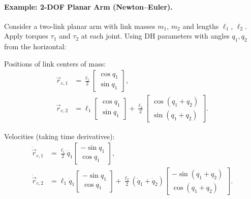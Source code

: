 \paragraph{Example: 2-DOF Planar Arm (Newton--Euler).}

Consider a two-link planar arm with link masses $m_1$, $m_2$ and lengths $\ell_1$, $\ell_2$.
Apply torques $\tau_1$ and $\tau_2$ at each joint. Using DH parameters with angles
$q_1, q_2$ from the horizontal:

Positions of link centers of mass:
\begin{align}
\vec{r}_{c,1} &= \frac{\ell_1}{2}\begin{bmatrix}\cos q_1 \\ \sin q_1\end{bmatrix}, \\
\vec{r}_{c,2} &= \ell_1\begin{bmatrix}\cos q_1 \\ \sin q_1\end{bmatrix}
+ \frac{\ell_2}{2}\begin{bmatrix}\cos(q_1+q_2) \\ \sin(q_1+q_2)\end{bmatrix}.
\end{align}

Velocities (taking time derivatives):
\begin{align}
\dot{\vec{r}}_{c,1} &= \frac{\ell_1}{2}\dot q_1 \begin{bmatrix}-\sin q_1 \\ \cos q_1\end{bmatrix}, \\
\dot{\vec{r}}_{c,2} &= \ell_1\dot q_1 \begin{bmatrix}-\sin q_1 \\ \cos q_1\end{bmatrix}
+ \frac{\ell_2}{2}(\dot q_1+\dot q_2) \begin{bmatrix}-\sin(q_1+q_2) \\ \cos(q_1+q_2)\end{bmatrix}.
\end{align}

